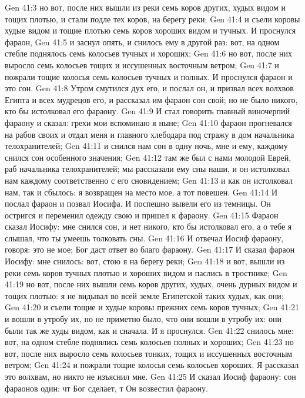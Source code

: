 \vs Gen 41:3 но вот, после них вышли из реки семь коров других, худых видом и тощих плотью, и стали подле тех коров, на берегу реки;
\vs Gen 41:4 и съели коровы худые видом и тощие плотью семь коров хороших видом и тучных. И проснулся фараон,
\vs Gen 41:5 и заснул опять, и снилось ему в другой раз: вот, на одном стебле поднялось семь колосьев тучных и хороших;
\vs Gen 41:6 но вот, после них выросло семь колосьев тощих и иссушенных восточным ветром;
\vs Gen 41:7 и пожрали тощие колосья семь колосьев тучных и полных. И проснулся фараон и  это сон.
\vs Gen 41:8 Утром смутился дух его, и послал он, и призвал всех волхвов Египта и всех мудрецов его, и рассказал им фараон сон свой; но не было никого, кто бы истолковал его фараону.
\vs Gen 41:9 И стал говорить главный виночерпий фараону и сказал: грехи мои вспоминаю я ныне;
\vs Gen 41:10 фараон прогневался на рабов своих и отдал меня и главного хлебодара под стражу в дом начальника телохранителей;
\vs Gen 41:11 и снился нам сон в одну ночь, мне и ему, каждому снился сон особенного значения;
\vs Gen 41:12 там же был с нами молодой Еврей, раб начальника телохранителей; мы рассказали ему сны наши, и он истолковал нам каждому соответственно с его сновидением;
\vs Gen 41:13 и как он истолковал нам, так и сбылось: я возвращен на место мое, а тот повешен.
\vs Gen 41:14 И послал фараон и позвал Иосифа. И поспешно вывели его из темницы. Он остригся и переменил одежду свою и пришел к фараону.
\vs Gen 41:15 Фараон сказал Иосифу: мне снился сон, и нет никого, кто бы истолковал его, а о тебе я слышал, что ты умеешь толковать сны.
\vs Gen 41:16 И отвечал Иосиф фараону, говоря: это не мое; Бог даст ответ во благо фараону.
\vs Gen 41:17 И сказал фараон Иосифу: мне снилось: вот, стою я на берегу реки;
\vs Gen 41:18 и вот, вышли из реки семь коров тучных плотью и хороших видом и паслись в тростнике;
\vs Gen 41:19 но вот, после них вышли семь коров других, худых, очень дурных видом и тощих плотью: я не видывал во всей земле Египетской таких худых, как они;
\vs Gen 41:20 и съели тощие и худые коровы прежних семь коров тучных;
\vs Gen 41:21 и вошли  в утробу их, но не приметно было, что они вошли в утробу их: они были так же худы видом, как и сначала. И я проснулся.
\vs Gen 41:22  снилось мне: вот, на одном стебле поднялись семь колосьев полных и хороших;
\vs Gen 41:23 но вот, после них выросло семь колосьев тонких, тощих и иссушенных восточным ветром;
\vs Gen 41:24 и пожрали тощие колосья семь колосьев хороших. Я рассказал это волхвам, но никто не изъяснил мне.
\vs Gen 41:25 И сказал Иосиф фараону: сон фараонов один: чт Бог сделает, т Он возвестил фараону.
